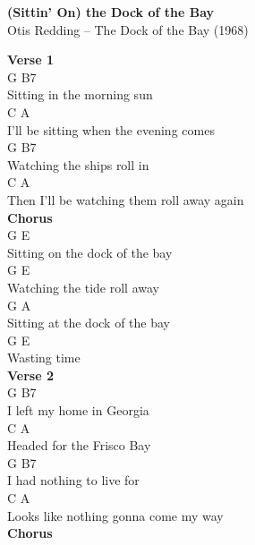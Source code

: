 \documentclass[a4paper]{article}
\begin{document}
    \begin{center}
        \textbf{(Sittin' On) the Dock of the Bay}
        ~\\
        Otis Redding -- The Dock of the Bay (1968)
    \end{center}
    {
        \scriptsize
        \textbf{Verse 1}
        ~\\
        {
            \cutive
            \obeyspaces
G                      B7
\\
Sitting in the morning sun
\\
        C                        A
\\
I'll be sitting when the evening comes
\\
G                       B7
\\
Watching the ships roll in
\\
             C                       A
\\
Then I'll be watching them roll away again
\\

        }
        \textbf{Chorus}
        ~\\
        {
            \cutive
            \obeyspaces
G                          E
\\
Sitting on the dock of the bay
\\
             G          E
\\
Watching the tide roll away
\\
G                          A
\\
Sitting at the dock of the bay
\\
        G   E
\\
Wasting time 
\\

        }
        \textbf{Verse 2}
        ~\\
        {
            \cutive
            \obeyspaces
G                 B7
\\
I left my home in Georgia
\\
C                     A
\\
Headed for the Frisco Bay
\\
  G              B7
\\
I had nothing to live for
\\
           C                     A
\\
Looks like nothing gonna come my way
\\

        }
        \textbf{Chorus}
        ~\\
        {
            \cutive
            \obeyspaces

}}
\end{document}

